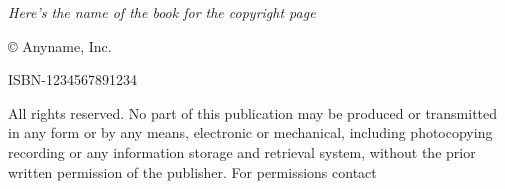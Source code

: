 \null\vfill
\begin{flushleft}
\thispagestyle{empty}
\textit{Here's the name of the book for the copyright page}

© Anyname, Inc. 

ISBN-1234567891234

\noindent All rights reserved. No part of this publication may be produced or transmitted in any form or by any means, electronic or mechanical, including photocopying recording or any information storage and retrieval system, without the prior written permission of the publisher. For permissions contact 
\end{flushleft}
